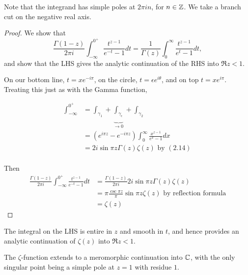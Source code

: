 \documentclass[a4paper]{article}
\begin{document}
Note that the integrand has simple poles at $2\pi i n$, for $n \in \mathbb{Z}$. We take a branch cut on the negative real axis.

\begin{figure}[H]
    \centering
\end{figure}

\begin{proof}
	We show that \[
		\frac{\Gamma(1-z)}{2\pi i} \int_{-\infty}^{0^{+}} \frac{t^{z-1}}{ e^{-t} - 1} dt = \frac{1}{\Gamma(z)} \int_{0}^{\infty} \frac{t^{z-1}}{e^{t} -1} dt
	,\] 
	and show that the LHS gives the analytic continuation of the RHS into $\Re z < 1$.

	On our bottom line, $t = xe^{-i\pi}$, on the circle, $t = \epsilon e^{i\theta}$, and on top $t = xe^{i\pi}$. Treating this just as with the Gamma function,

	 \begin{align*}
		 \int_{-\infty}^{0^+} &= \int_{\gamma_1} + \underbrace{\int_{\gamma_{\epsilon}}}_{\to 0} + \int_{\gamma_2} \\
		 &= \left(e^{i\pi z} - e^{-i \pi z}\right)\int_{0}^{\infty} \frac{x^{z-1}}{e^{x} - 1} dx \\
		 &= 2 i \sin \pi z \Gamma(z) \zeta(z) \text{ by } (2.14)\\ 
	 \end{align*}

	 Then 
	 \begin{align*}
		 \frac{\Gamma(1-z)}{2\pi i} \int_{-\infty}^{0^{+}} \frac{t^{z-1}}{e^{-t} - 1} dt &=  \frac{\Gamma(1-z)}{2\pi i} 2 i \sin \pi z \Gamma(z) \zeta(z)\\ 
		 &= \pi \frac{\csc \pi z}{\pi} \sin \pi z \zeta(z) \text{ by reflection formula}\\
		 &= \zeta(z)
	 \end{align*}
\end{proof}

The integral on the LHS is entire in $z$ and smooth in $t$, and hence provides an analytic continuation of $\zeta(z) $ into $\Re z < 1$.

 \begin{prop}
	The $\zeta$-function extends to a meromorphic continuation into $\mathbb{C}$, with the only singular point being a simple pole at  $z=1$ with residue $1$.
\end{prop}
\end{document}
